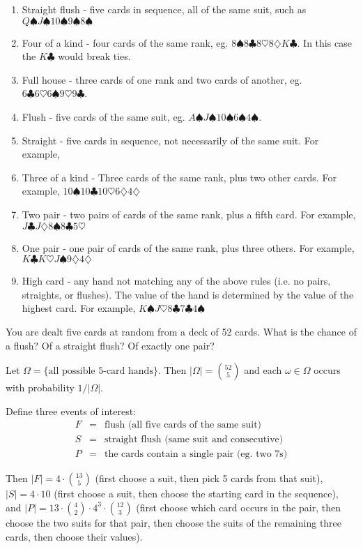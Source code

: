 \begin{enumerate}
\begin{enumerate}
\item Straight flush - five cards in sequence, all of the
  same suit, such as $Q\spadesuit J\spadesuit 10\spadesuit 9\spadesuit
  8\spadesuit$

\item Four of a kind - four cards of the same rank, eg. $8\spadesuit
  8\clubsuit 8\heartsuit 8\diamondsuit K\clubsuit$. In this case the
  $K\clubsuit$ would break ties.

\item Full house - three cards of one rank and two cards of another,
  eg. $6\clubsuit 6\heartsuit 6\spadesuit 9\heartsuit 9\clubsuit$.
\item Flush - five cards of the same suit, eg. $A\spadesuit
  J\spadesuit 10\spadesuit 6\spadesuit 4\spadesuit$.
\item Straight - five cards in sequence, not necessarily of the same
  suit. For example, 
\item Three of a kind - Three cards of the same rank, plus two other
  cards. For example, $10\spadesuit 10\clubsuit 10\heartsuit
  6\diamondsuit 4\diamondsuit$
\item Two pair - two pairs of cards of the same rank, plus a fifth
  card. For example, $J\clubsuit J\diamondsuit 8\spadesuit 8\clubsuit 5\heartsuit$
\item One pair - one pair of cards of the same rank, plus three
  others. For example, $K\clubsuit K\heartsuit J\spadesuit
  9\diamondsuit 4\diamondsuit$
\item High card - any hand not matching any of the above rules
  (i.e. no pairs, straights, or flushes). The value of the hand is
  determined by the value of the highest card. For example,
  $K\spadesuit J\heartsuit 8\clubsuit 7\clubsuit 4\spadesuit$

\end{enumerate}

You are dealt five cards at random from a deck of 52 cards. What is the chance of a flush? Of a straight flush? Of exactly one pair?

Let $\Omega = \{\mbox{all possible 5-card hands}\}$. Then $|\Omega| = {52 \choose 5}$ and each $\omega \in \Omega$ occurs with probability $1/|\Omega|$. 

Define three events of interest: 
\begin{eqnarray*}
F & = & \mbox{flush (all five cards of the same suit)} \\
S & = & \mbox{straight flush (same suit and consecutive)} \\
P & = & \mbox{the cards contain a single pair (eg. two 7s)}
\end{eqnarray*}

Then $|F| = 4 \cdot {13 \choose 5}$ (first choose a suit, then pick 5 cards from that suit), $|S| = 4 \cdot 10$ (first choose a suit, then choose the starting card in the sequence), and $|P| = 13 \cdot {4 \choose 2} \cdot 4^3 \cdot {12 \choose 3}$ (first choose which card occurs in the pair, then choose the two suits for that pair, then choose the suits of the remaining three cards, then choose their values).
 
\end{enumerate}

